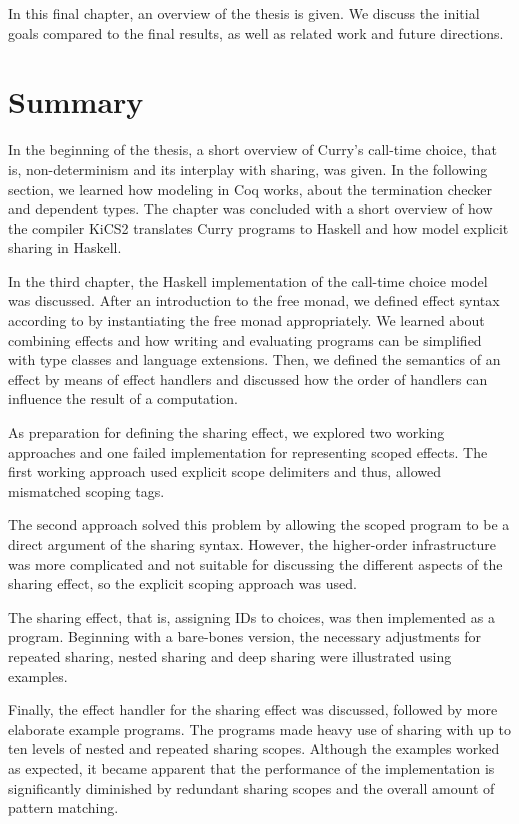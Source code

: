 \documentclass[a4paper, 11pt, fleqn, twoside, abstract=on]{scrreprt}
\begin{document}
In this final chapter, an overview of the thesis is given.
We discuss the initial goals compared to the final results, as well as related work and future directions.

\section{Summary}

In the beginning of the thesis, a short overview of Curry's call-time choice, that is, non-determinism and its interplay with sharing, was given.
In the following section, we learned how modeling in Coq works, about the termination checker and dependent types.
The chapter was concluded with a short overview of how the compiler KiCS2 translates Curry programs to Haskell and how \citet{fischer2009purely} model explicit sharing in Haskell.

In the third chapter, the Haskell implementation of the call-time choice model was discussed.
After an introduction to the free monad, we defined effect syntax according to \citet{wu2014effect} by instantiating the free monad appropriately.
We learned about combining effects and how writing and evaluating programs can be simplified with type classes and language extensions.
Then, we defined the semantics of an effect by means of effect handlers and discussed how the order of handlers can influence the result of a computation.

As preparation for defining the sharing effect, we explored two working approaches and one failed implementation for representing scoped effects.
The first working approach used explicit scope delimiters and thus, allowed mismatched scoping tags.

The second approach solved this problem by allowing the scoped program to be a direct argument of the sharing syntax.
However, the higher-order infrastructure was more complicated and not suitable for discussing the different aspects of the sharing effect, so the explicit scoping approach was used.

The sharing effect, that is, assigning IDs to choices, was then implemented as a program.
Beginning with a bare-bones version, the necessary adjustments for repeated sharing, nested sharing and deep sharing were illustrated using examples.

Finally, the effect handler for the sharing effect was discussed, followed by more elaborate example programs.
The programs made heavy use of sharing with up to ten levels of nested and repeated sharing scopes.
Although the examples worked as expected, it became apparent that the performance of the implementation is significantly diminished by redundant sharing scopes and the overall amount of pattern matching.
\end{document}
